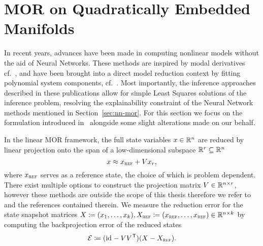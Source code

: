 \section{MOR on Quadratically Embedded Manifolds}\label{sec:mor-quadratically-embedded-manifolds}

In recent years, advances have been made in computing nonlinear models without the aid of Neural Networks.
These methods are inspired by modal derivatives cf.~\cite{Wu2016, Weeger2016, Jain2017, Rutzmoser2017}, and have been brought into a direct model reduction context by fitting polynomial system components, cf.~\cite{Peherstorfer2016, BGK2020, BGH2020, Gosea2021, Barnett2022, Khodabakhshi2022, Qian2022, Geelen2023}.
Most importantly, the inference approaches described in these publications allow for simple Least Squares solutions of the inference problem, resolving the explainability constraint of the Neural Network methods mentioned in Section~\ref{sec:nn-mor}.
For this section we focus on the formulation introduced in~\cite{Geelen2023} alongside some slight alterations made on our behalf.

In the linear MOR framework, the full state variables $x \in \mathbb{R}^n$ are reduced by linear projection onto the span of a low-dimensional subspace $\mathbb{R}^r \subseteq \mathbb{R}^n$
\begin{equation}\label{eq:linear-state-reduction}
    x \approx x_{\textnormal{\scshape ref}} + V x_r,
\end{equation}
where $x_{\textnormal{\scshape ref}}$ serves as a reference state, the choice of which is problem dependent.
There exist multiple options to construct the projection matrix $V \in \mathbb{R}^{n \times r}$, however these methods are outside the scope of this thesis therefore we refer to~\cite{BOP2017, BCO2017} and the references contained therein.
We measure the reduction error for the state snapshot matrices $X \coloneqq (x_1, \dots, x_k), X_{\textnormal{\scshape ref}} \coloneqq (x_{\textnormal{\scshape ref}}, \dots, x_{\textnormal{\scshape ref}}) \in \mathbb{R}^{n \times k}$ by computing the backprojection error of the reduced states
\begin{equation}
    \mathcal{E} \coloneqq (\text{id}_{} - V V^{\mkern1mu \mathsf{T}}) (X - X_{\textnormal{\scshape ref}}).
\end{equation}

